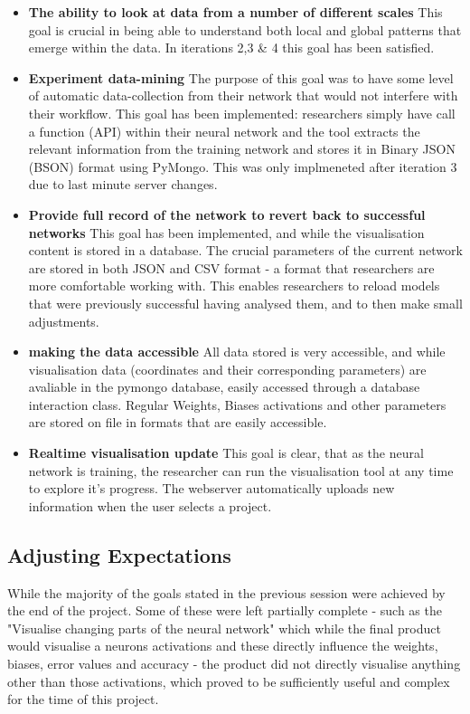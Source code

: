 \documentclass[a4paper,11pt,titlepage]{article}
\begin{document}
\begin{itemize}
			\item \textbf{The ability to look at data from a number of different scales} 
			This goal is crucial in being able to understand both local and global patterns that emerge within the data. In iterations 2,3 \& 4 this goal has been satisfied.
			\item \textbf{Experiment data-mining}
			The purpose of this goal was to have some level of automatic data-collection from their network that would not interfere with their workflow. This goal has been implemented: researchers simply have call a function (API) within their neural network and the tool extracts the relevant information from the training network and stores it in Binary JSON (BSON) format using PyMongo. This was only implmeneted after iteration 3 due to last minute server changes.
			\item \textbf{Provide full record of the network to revert back to successful networks}
			This goal has been implemented, and while the visualisation content is stored in a database. The crucial parameters of the current network are stored in both JSON and CSV format - a format that researchers are more comfortable working with. This enables researchers to reload models that were previously successful having analysed them, and to then make small adjustments.
			\item \textbf{making the data accessible}
			All data stored is very accessible, and while visualisation data (coordinates and their corresponding parameters) are avaliable in the pymongo database, easily accessed through a database interaction class. Regular Weights, Biases activations and other parameters are stored on file in formats that are easily accessible.
			\item \textbf{Realtime visualisation update} 
			This goal is clear, that as the neural network is training, the researcher can run the visualisation tool at any time to explore it's progress. The webserver automatically uploads new information when the user selects a project.

	\end{itemize}	
	\subsection{Adjusting Expectations}
	While the majority of the goals stated in the previous session were achieved by the end of the project. Some of these were left partially complete - such as the "Visualise changing parts of the neural network" which while the final product would visualise a neurons activations and these directly influence the weights, biases, error values and accuracy - the product did not directly visualise anything other than those activations, which proved to be sufficiently useful and complex for the time of this project.
		
\end{document}
